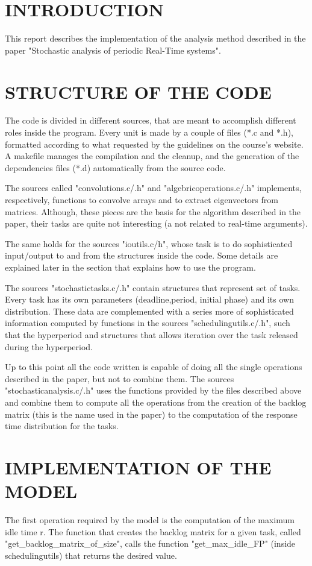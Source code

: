 \documentclass[a4paper]{article}
\begin{document}
\section{INTRODUCTION}
This report describes the implementation of the analysis method described in the paper "Stochastic analysis of periodic Real-Time systems". 

\section{STRUCTURE OF THE CODE}
The code is divided in different sources, that are meant to accomplish different roles inside the program. Every
unit is made by a couple of files (*.c and *.h), formatted according to what requested by the guidelines on the course's website. A makefile manages the compilation and the cleanup, and the generation of the dependencies files (*.d) automatically from the source code.

The sources called "convolutions.c/.h" and "algebricoperations.c/.h" implements, respectively, functions to convolve arrays and to extract eigenvectors from matrices. Although, these pieces are the basis for the algorithm described in the paper, their tasks are quite not interesting (a not related to real-time arguments).

The same holds for the sources "ioutils.c/h", whose task is to do sophisticated input/output to and from the structures inside the code. Some details are explained later in the section that explains how to use the program.

The sources "stochastictasks.c/.h" contain structures that represent set of tasks. Every task has its own parameters (deadline,period, initial phase) and its own distribution. These data are complemented with a series more of sophisticated information computed by functions in the sources "schedulingutils.c/.h", such that the hyperperiod and  structures that allows iteration over the task released during the hyperperiod.

Up to this point all the code written is capable of doing all the single operations described in the paper, but not to combine them. The sources "stochasticanalysis.c/.h" uses the functions provided by the files described above and combine them to compute all the operations from the creation of the backlog matrix (this is the name used in the paper) to the computation of the response time distribution for the tasks.

\section{IMPLEMENTATION OF THE MODEL}
The first operation required by the model is the computation of the maximum idle time r. The function that creates the backlog matrix for a given task, called "get\_backlog\_matrix\_of\_size", calls the function "get\_max\_idle\_FP" (inside schedulingutils) that returns the desired value. 
\end{document}
